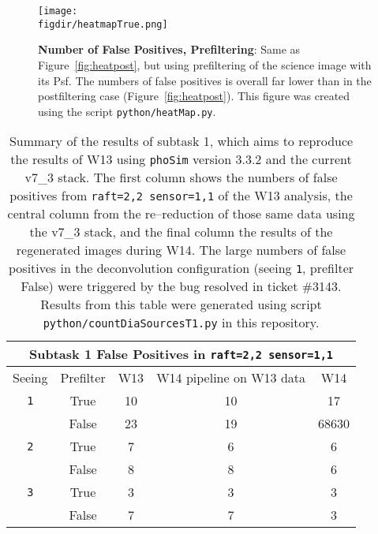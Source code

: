 \documentclass[prd, nofootinbib, floatfix, 11pt, tightenlines, times]{article}
\def\figdir{../figures}
\begin{document}
\begin{figure}[h!]
  \centering
  \texttt{[image: \\figdir/heatmapTrue.png]}
  \caption{{\bf Number of False Positives, Prefiltering}: Same as
    Figure~\ref{fig:heatpost}, but using prefiltering of the science
    image with its Psf.  The numbers of false positives is overall far
    lower than in the postfiltering case (Figure~\ref{fig:heatpost}).
    This figure was created using the script {\tt python/heatMap.py}.}
  \label{fig:heatpre}
\end{figure}

%

\clearpage

\begin{table}
\centering
\begin{tabular}{ccccc}
\hline
\multicolumn{5}{|c|}{Subtask 1 False Positives in {\tt raft=2,2 sensor=1,1}} \\
\hline
Seeing  & Prefilter    & W13  & W14 pipeline on W13 data   & W14   \\
\hline
{\tt 1} & True         & 10   & 10                         & 17    \\
        & False        & 23   & 19                         & 68630 \\
{\tt 2} & True         & 7    & 6                          & 6     \\
        & False        & 8    & 8                          & 6     \\
{\tt 3} & True         & 3    & 3                          & 3     \\
        & False        & 7    & 7                          & 3 
\end{tabular}
\caption[]{Summary of the results of subtask 1, which aims to
  reproduce the results of W13 using {\tt phoSim} version 3.3.2 and
  the current v7\_3 stack.  The first column shows the numbers of
  false positives from {\tt raft=2,2 sensor=1,1} of the W13 analysis,
  the central column from the re--reduction of those same data using
  the v7\_3 stack, and the final column the results of the regenerated
  images during W14.  The large numbers of false positives in the
  deconvolution configuration (seeing {\tt 1}, prefilter False) were
  triggered by the bug resolved in ticket \#3143.  Results from this
  table were generated using script {\tt python/countDiaSourcesT1.py}
  in this repository.}
\label{tab:task1}
\end{table}
\end{document}
